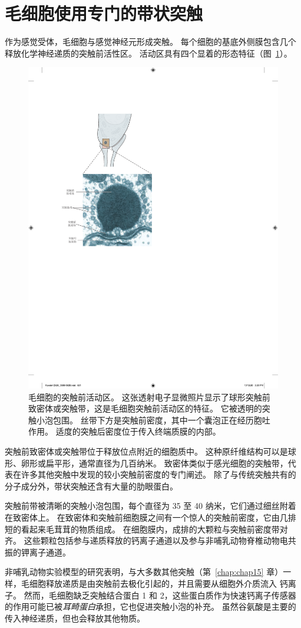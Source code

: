 \section{毛细胞使用专门的带状突触}

作为感觉受体，毛细胞与感觉神经元形成突触。
每个细胞的基底外侧膜包含几个释放化学神经递质的突触前活性区。
活动区具有四个显着的形态特征（图~\ref{fig:26_16}）。


\begin{figure}[htbp]
	\centering
	\includegraphics[width=0.65\linewidth]{chap26/fig_26_16}
	\caption{毛细胞的突触前活动区。
		这张透射电子显微照片显示了球形突触前致密体或突触带，这是毛细胞突触前活动区的特征。
		它被透明的突触小泡包围。
		丝带下方是突触前密度，其中一个囊泡正在经历胞吐作用。
		适度的突触后密度位于传入终端质膜的内部。 }
	\label{fig:26_16}
\end{figure}


突触前致密体或突触带位于释放位点附近的细胞质中。
这种原纤维结构可以是球形、卵形或扁平形，通常直径为几百纳米。
致密体类似于感光细胞的突触带，代表在许多其他突触中发现的较小突触前密度的专门阐述。
除了与传统突触共有的分子成分外，带状突触还含有大量的肋眼蛋白。


突触前带被清晰的突触小泡包围，每个直径为 35 至 40 纳米，它们通过细丝附着在致密体上。
在致密体和突触前细胞膜之间有一个惊人的突触前密度，它由几排短的看起来毛茸茸的物质组成。
在细胞膜内，成排的大颗粒与突触前密度带对齐。
这些颗粒包括参与递质释放的钙离子通道以及参与非哺乳动物脊椎动物电共振的钾离子通道。


非哺乳动物实验模型的研究表明，与大多数其他突触（第~\ref{chap:chap15} 章）一样，毛细胞释放递质是由突触前去极化引起的，并且需要从细胞外介质流入 钙离子。
然而，毛细胞缺乏突触结合蛋白 1 和 2，这些蛋白质作为快速钙离子传感器的作用可能已被\textit{耳畸蛋白}承担，它也促进突触小泡的补充。
虽然谷氨酸是主要的传入神经递质，但也会释放其他物质。


